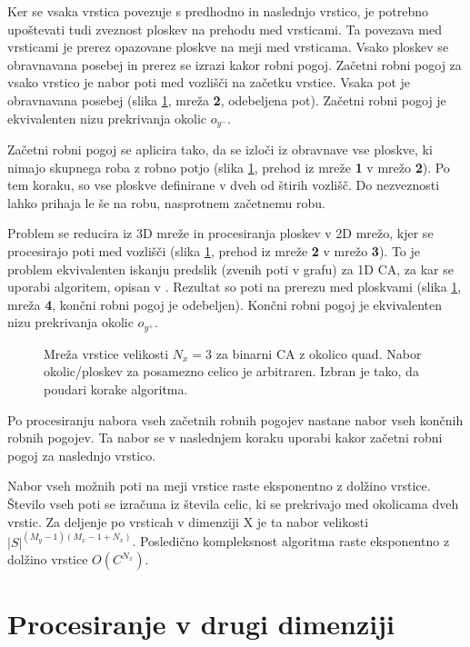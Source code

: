 \documentclass[12pt,a4paper,openany,twoside]{book}
\begin{document}
Ker se vsaka vrstica povezuje s predhodno in naslednjo vrstico, je potrebno
upoštevati tudi zveznost ploskev na prehodu med vrsticami.
Ta povezava med vrsticami je prerez opazovane ploskve na meji med vrsticama.
Vsako ploskev se obravnavana posebej in prerez se izrazi kakor robni pogoj.
Začetni robni pogoj za vsako vrstico je nabor poti med vozlišči na začetku vrstice.
Vsaka pot je obravnavana posebej (slika \ref{algorithm_line}, mreža \textbf{2}, odebeljena pot).
Začetni robni pogoj je ekvivalenten nizu prekrivanja okolic \(o_{y^-}\).

Začetni robni pogoj se aplicira tako, da se izloči iz obravnave vse ploskve,
ki nimajo skupnega roba z robno potjo (slika \ref{algorithm_line},
prehod iz mreže \textbf{1} v mrežo \textbf{2}). Po tem koraku, so vse ploskve definirane
v dveh od štirih vozlišč. Do nezveznosti lahko prihaja le še na robu, nasprotnem
začetnemu robu.

Problem se reducira iz 3D mreže in procesiranja ploskev v
2D mrežo, kjer se procesirajo poti med vozlišči (slika \ref{algorithm_line},
prehod iz mreže \textbf{2} v mrežo \textbf{3}). To je problem ekvivalenten iskanju predslik
(zvenih poti v grafu) za 1D CA, za kar se uporabi algoritem, opisan v \cite{JerasDobnikar2007}.
Rezultat so poti na prerezu med ploskvami (slika \ref{algorithm_line}, mreža \textbf{4},
končni robni pogoj je odebeljen).
Končni robni pogoj je ekvivalenten nizu prekrivanja okolic \(o_{y^+}\).

\begin{figure}[htb]
\centerline{}
\caption[Algoritem procesiranja vrstice.]{Mreža vrstice velikosti \(N_x=3\) za binarni CA z okolico quad.
Nabor okolic/ploskev za posamezno celico je arbitraren. Izbran je tako, da poudari korake algoritma.}
\label{algorithm_line}
\end{figure}

Po procesiranju nabora vseh začetnih robnih pogojev nastane nabor vseh končnih robnih pogojev.
Ta nabor se v naslednjem koraku uporabi kakor začetni robni pogoj za naslednjo vrstico.

Nabor vseh možnih poti na meji vrstice raste eksponentno z dolžino vrstice.
Število vseh poti se izračuna iz števila celic, ki se prekrivajo med okolicama dveh vrstic.
Za deljenje po vrsticah v dimenziji X je ta nabor velikosti \( |S|^{(M_y-1)(M_x-1+N_x)} \).
Posledično kompleksnost algoritma raste eksponentno z dolžino vrstice \(O(C^{N_x})\).

\section{Procesiranje v drugi dimenziji}
\end{document}
